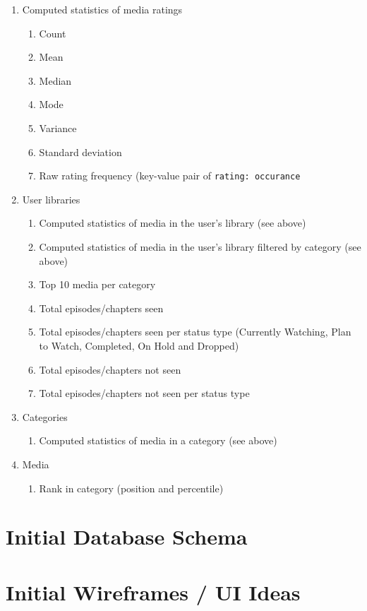 \begin{enumerate}
  \item Computed statistics of media ratings
    \begin{enumerate}
      \item Count
      \item Mean
      \item Median
      \item Mode
      \item Variance
      \item Standard deviation
      \item Raw rating frequency (key-value pair of \texttt{rating: occurance}
    \end{enumerate}
  \item User libraries
    \begin{enumerate}
      \item Computed statistics of media in the user's library (see above)
      \item Computed statistics of media in the user's library filtered by category (see above)
      \item Top 10 media per category
      \item Total episodes/chapters seen
      \item Total episodes/chapters seen per status type (Currently Watching, Plan to Watch, Completed, On Hold and Dropped)
      \item Total episodes/chapters not seen
      \item Total episodes/chapters not seen per status type
    \end{enumerate}
  \item Categories
    \begin{enumerate}
      \item Computed statistics of media in a category (see above)
    \end{enumerate}
  \item Media
    \begin{enumerate}
      \item Rank in category (position and percentile)
    \end{enumerate}
\end{enumerate}

\section{Initial Database Schema}

\section{Initial Wireframes / UI Ideas}
